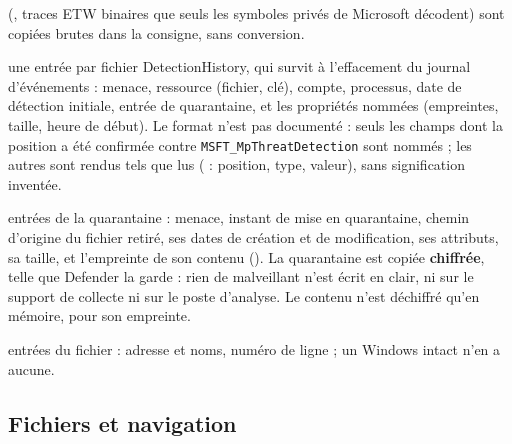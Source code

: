 \documentclass[11pt,a4paper,oneside]{report}
\begin{document}
\begin{description}[style=nextline,leftmargin=1.2em]
        (, traces ETW binaires que seuls les symboles
        privés de Microsoft décodent) sont copiées brutes dans la consigne, sans
        conversion.
  \item[\fichier{defender\_detections.json}] une entrée par fichier
        DetectionHistory, qui survit à l'effacement du journal d'événements :
        menace, ressource (fichier, clé), compte, processus, date de détection
        initiale, entrée de quarantaine, et les propriétés nommées
         (empreintes, taille, heure de début). Le format
        n'est pas documenté : seuls les champs dont la position a été confirmée
        contre \texttt{MSFT\_MpThreatDetection} sont nommés ; les autres sont
        rendus tels que lus ( : position, type, valeur),
        sans signification inventée.
  \item[\fichier{defender\_quarantine.json}] entrées de la quarantaine :
        menace, instant de mise en quarantaine, chemin d'origine du fichier
        retiré, ses dates de création et de modification, ses attributs, sa
        taille, et l'empreinte de son contenu (). La
        quarantaine est copiée \textbf{chiffrée}, telle que Defender la garde :
        rien de malveillant n'est écrit en clair, ni sur le support de collecte
        ni sur le poste d'analyse. Le contenu n'est déchiffré qu'en mémoire,
        pour son empreinte.
  \item[\fichier{hosts.json}] entrées du fichier  : adresse et
        noms, numéro de ligne ; un Windows intact n'en a aucune.
\end{description}

\subsection{Fichiers et navigation}
\end{document}
